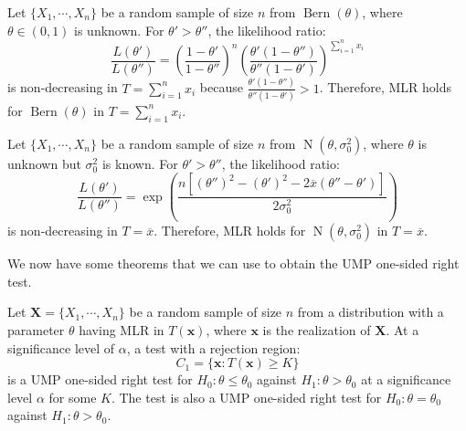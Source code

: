 \documentclass{huhtakm-template-book-v2}
\DeclareMathOperator{\Bern}{Bern}
\DeclareMathOperator{\N}{N}
\begin{document}
    \begin{eg}
        Let $\{X_{1},\cdots,X_{n}\}$ be a random sample of size $n$ from $\Bern(\theta)$, where $\theta\in(0,1)$ is unknown. For $\theta'>\theta''$, the likelihood ratio:
        \begin{equation*}
            \frac{L(\theta')}{L(\theta'')}=\left(\frac{1-\theta'}{1-\theta''}\right)^{n}\left(\frac{\theta'(1-\theta'')}{\theta''(1-\theta')}\right)^{\sum_{i=1}^{n}x_{i}}
        \end{equation*}
        is non-decreasing in $T=\sum_{i=1}^{n}x_{i}$ because $\frac{\theta'(1-\theta'')}{\theta''(1-\theta')}>1$. Therefore, MLR holds for $\Bern(\theta)$ in $T=\sum_{i=1}^{n}x_{i}$.
    \end{eg}
    \begin{eg}
        \label{Chapter 4 (Example) MLR for N(mu,sigma^2)}
        Let $\{X_{1},\cdots,X_{n}\}$ be a random sample of size $n$ from $\N(\theta,\sigma_{0}^{2})$, where $\theta$ is unknown but $\sigma_{0}^{2}$ is known. For $\theta'>\theta''$, the likelihood ratio:
        \begin{equation*}
            \frac{L(\theta')}{L(\theta'')}=\exp\left(\frac{n[(\theta'')^{2}-(\theta')^{2}-2\overline{x}(\theta''-\theta')]}{2\sigma_{0}^{2}}\right)
        \end{equation*}
        is non-decreasing in $T=\overline{x}$. Therefore, MLR holds for $\N(\theta,\sigma_{0}^{2})$ in $T=\overline{x}$.
    \end{eg}
    We now have some theorems that we can use to obtain the UMP one-sided right test.
    \begin{thm}
        Let $\mathbf{X}=\{X_{1},\cdots,X_{n}\}$ be a random sample of size $n$ from a distribution with a parameter $\theta$ having MLR in $T(\mathbf{x})$, where $\mathbf{x}$ is the realization of $\mathbf{X}$. At a significance level of $\alpha$, a test with a rejection region:
        \begin{equation*}
            C_{1}=\{\mathbf{x}:T(\mathbf{x})\geq K\}
        \end{equation*}
        is a UMP one-sided right test for $H_{0}:\theta\leq\theta_{0}$ against $H_{1}:\theta>\theta_{0}$ at a significance level $\alpha$ for some $K$. The test is also a UMP one-sided right test for $H_{0}:\theta=\theta_{0}$ against $H_{1}:\theta>\theta_{0}$.
    \end{thm}
    \newpage
    
\end{document}

